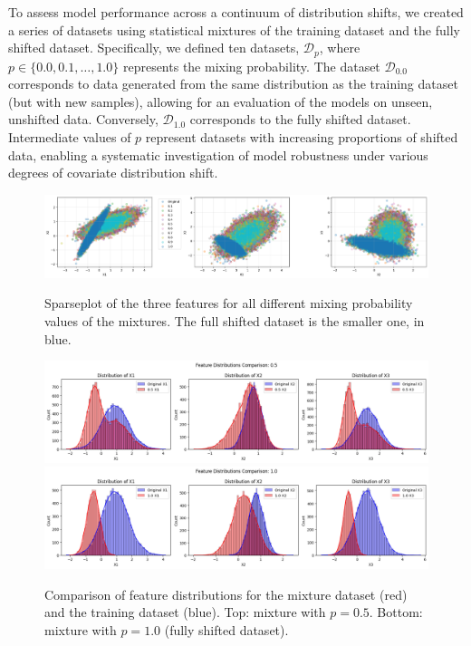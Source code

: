 To assess model performance across a continuum of distribution shifts, we created a series of datasets using statistical mixtures of the training dataset and the fully shifted dataset. Specifically, we defined ten datasets, $\mathcal{D}_p$, where $p \in \{0.0, 0.1, \ldots, 1.0\}$ represents the mixing probability. The dataset $\mathcal{D}_{0.0}$ corresponds to data generated from the same distribution as the training dataset (but with new samples), allowing for an evaluation of the models on unseen, unshifted data. Conversely, $\mathcal{D}_{1.0}$ corresponds to the fully shifted dataset. Intermediate values of $p$ represent datasets with increasing proportions of shifted data, enabling a systematic investigation of model robustness under various degrees of covariate distribution shift.


\begin{figure}
    \centering
    \includegraphics[width=1.0\textwidth]{assets/sparse_mix_shift.png}
    \caption{Sparseplot of the three features for all different mixing probability values of the mixtures. The full shifted dataset is the smaller one, in blue.}
    \label{fig:sparse_mix_shift}
    \vspace{1.5cm}
    \includegraphics[width=1.0\textwidth]{assets/dist_mix05.png}
    \includegraphics[width=1.0\textwidth]{assets/dist_fullshift.png}
    \caption{Comparison of feature distributions for the mixture dataset (red) and the training dataset (blue). Top: mixture with $p=0.5$. Bottom: mixture with $p=1.0$ (fully shifted dataset).}
    \label{fig:dist_mix05}
\end{figure}


